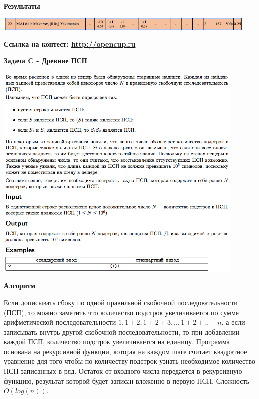 \documentclass[a4paper,12pt]{article}
\begin{document}
\textbf{{\large Результаты}} \\
\begin{center}
\includegraphics[width=0.95\textwidth]{OC_Ural/OC_Ural_result.png}\\ [1cm]
\end{center}

\textbf{{\large Ссылка на контест: \url{http://opencup.ru}}}

\newpage
\textbf{{\large Задача C - Древние ПСП}}

\begin{center}
\includegraphics[width=0.9\textwidth]{OC_Ural/OC_Ural_C.png}\\ [1cm]
\end{center}

\newpage
\textbf{{\large Алгоритм}}

Если дописывать сбоку по одной правильной скобочной последовательности (ПСП), то можно заметить что количество подстрок увеличивается по сумме арифметической последовательности $1, 1+2, 1+2+3, .., 1+2+..+n$, а если записывать внутрь другой скобочной последовательности, то при добавлении каждой ПСП, количество подстрок увеличивается на единицу. Программа основана на рекурсивной функции, которая на каждом шаге считает квадратное уравнение для того чтобы по количеству подстрок узнать необходимое количество ПСП записанных в ряд. Остаток от входного числа передаётся в рекурсивную функцию, результат которой будет записан вложенно в первую ПСП. Сложность $O(log(n))$.\\
\end{document}
